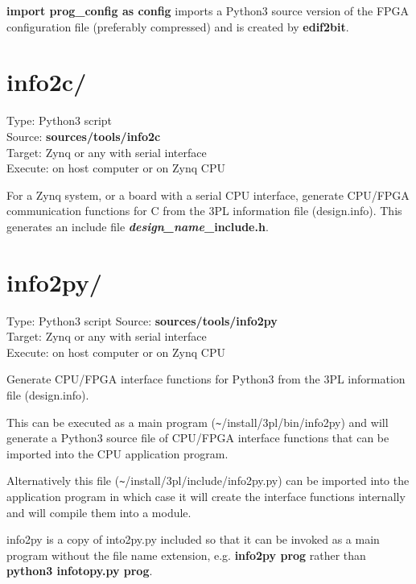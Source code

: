         {\bf import prog\_config as config} imports a Python3 source version of the
        FPGA configuration file (preferably compressed) and is created by {\bf
        edif2bit}.


        
    \section{info2c/}

        Type: Python3 script\\
        Source: {\bf sources/tools/info2c}\\
        Target: Zynq or any with serial interface\\       
        Execute: on host computer or on Zynq CPU

        For a Zynq system, or a board with a serial CPU interface, generate
        CPU/FPGA communication functions for C from the 3PL
        information file (design.info). This generates an include file
        {\bf {\em design\_name}\_include.h}.


    \section{info2py/}
    
        Type: Python3 script        
        Source: {\bf sources/tools/info2py}\\
        Target: Zynq or any with serial interface\\       
        Execute: on host computer or on Zynq CPU
    
        Generate CPU/FPGA interface functions for
        Python3 from the 3PL information file (design.info).
        
        This can be executed as a main program (\verb'~'/install/3pl/bin/info2py) and will
        generate a Python3 source file of CPU/FPGA interface functions that can be
        imported into the CPU application program.
        
        Alternatively this file (\verb'~'/install/3pl/include/info2py.py) can be imported
        into the application program in which case it will create the interface
        functions internally and will compile them into a module.

        info2py is a copy of into2py.py included so that it can be
        invoked as a main program without the file name extension, e.g.
        {\bf info2py prog} rather than {\bf python3 infotopy.py prog}.

